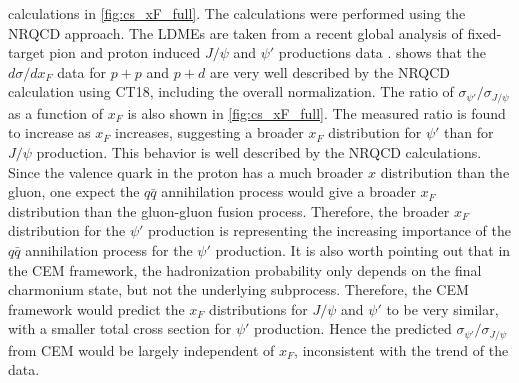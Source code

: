 \documentclass[../main.tex]{subfiles}
\begin{document}
calculations in \cref{fig:cs_xF_full}. The calculations were performed using the NRQCD approach.
The LDMEs are taken from a recent global analysis of fixed-target pion and proton induced $J/\psi$
and $\psi'$ productions data \cite{hsieh2021,chang2023}.
 shows that the $d\sigma/dx_F$ data for $p+p$ and $p+d$ are very well described
by the NRQCD calculation using CT18, including the overall normalization.
The ratio of $\sigma_{\psi'}/\sigma_{J/\psi}$ as a function of $x_F$
is also shown in \cref{fig:cs_xF_full}. The measured ratio is found to increase as $x_F$ increases,
suggesting a broader $x_F$ distribution for $\psi'$ than for $J/\psi$ production. 
This behavior is well described by the NRQCD calculations.
Since the valence quark in the proton has a much broader $x$ distribution than the gluon,
one expect the $q\bar{q}$ annihilation process would give a broader $x_F$ distribution than the
gluon-gluon fusion process. Therefore, the broader $x_F$ distribution for the $\psi'$ production
is representing the increasing importance of the $q\bar{q}$ annihilation process for the $\psi'$
production.
It is also worth pointing out that in the CEM framework, the hadronization probability only depends on
the final charmonium state, but not the underlying subprocess. Therefore, the CEM framework would predict
the $x_F$ distributions for $J/\psi$ and $\psi'$ to be very similar, with a smaller total cross section
for $\psi'$ production. Hence the predicted $\sigma_{\psi'}/\sigma_{J/\psi}$ from CEM would be
largely independent of $x_F$, inconsistent with the trend of the data.
\end{document}
